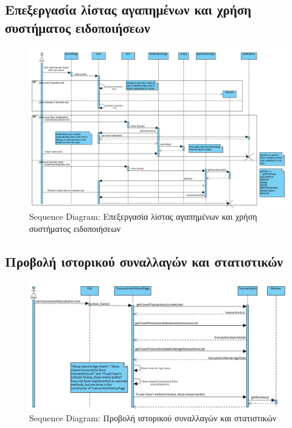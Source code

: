 \documentclass[12pt,a4paper]{article}
\begin{document}
\subsection{Επεξεργασία λίστας αγαπημένων και χρήση συστήματος ειδοποιήσεων}
\begin{figure}[H]
	\includegraphics[width=\textwidth]{Favorite Users and Notification System Sequence.png}
	\caption{Sequence Diagram: Επεξεργασία λίστας αγαπημένων και χρήση συστήματος ειδοποιήσεων}
	\label{Sequence Diagram: Επεξεργασία λίστας αγαπημένων και χρήση συστήματος ειδοποιήσεων}
\end{figure}

\subsection{Προβολή ιστορικού συναλλαγών και στατιστικών}
\begin{figure}[H]
	\includegraphics[width=\textwidth]{History and Statistics Sequence.png}
	\caption{Sequence Diagram: Προβολή ιστορικού συναλλαγών και στατιστικών}
	\label{Sequence Diagram: Προβολή ιστορικού συναλλαγών και στατιστικών}
\end{figure}
\end{document}
